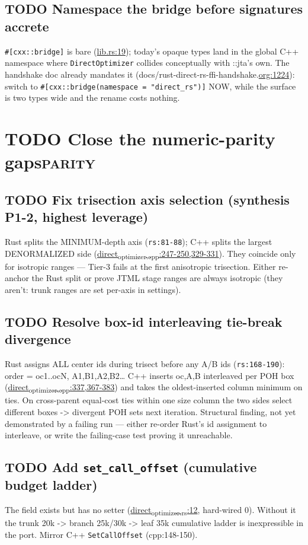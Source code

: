 \documentclass[11pt]{article}
\begin{document}
\subsection{{\bfseries\sffamily TODO} Namespace the bridge before signatures accrete}
\label{sec:org42a9213}
\texttt{\#[cxx::bridge]} is bare (\href{rust/direct-rs/src/lib.rs}{lib.rs:19}); today's opaque types land in the
global C++ namespace where \texttt{DirectOptimizer} collides conceptually with
::jta's own. The handshake doc already mandates it
(docs/rust-direct-rs-ffi-handshake.\url{org:1224}): switch to
\texttt{\#[cxx::bridge(namespace = "direct\_rs")]} NOW, while the surface is two
types wide and the rename costs nothing.
\section{{\bfseries\sffamily TODO} Close the numeric-parity gaps\hfill{}\textsc{parity}}
\label{sec:org01a4bc2}

\subsection{{\bfseries\sffamily TODO} Fix trisection axis selection (synthesis P1-2, highest leverage)}
\label{sec:orgb12c191}
Rust splits the MINIMUM-depth axis (\texttt{rs:81-88}); C++ splits the largest
DENORMALIZED side (\href{src/domain/direct\_optimizer.cpp}{direct\textsubscript{optimizer.cpp}:247-250,329-331}). They coincide
only for isotropic ranges — Tier-3 fails at the first anisotropic
trisection. Either re-anchor the Rust split or prove JTML stage ranges
are always isotropic (they aren't: trunk ranges are set per-axis in
settings).
\subsection{{\bfseries\sffamily TODO} Resolve box-id interleaving tie-break divergence}
\label{sec:org752a104}
Rust assigns ALL center ids during trisect before any A/B ids
(\texttt{rs:168-190}): order = oc1..ocN, A1,B1,A2,B2\ldots{} C++ inserts oc,A,B
interleaved per POH box (\href{src/domain/direct\_optimizer.cpp}{direct\textsubscript{optimizer.cpp}:337,367-383}) and takes the
oldest-inserted column minimum on ties. On cross-parent equal-cost ties
within one size column the two sides select different boxes -> divergent
POH sets next iteration. Structural finding, not yet demonstrated by a
failing run — either re-order Rust's id assignment to interleave, or
write the failing-case test proving it unreachable.
\subsection{{\bfseries\sffamily TODO} Add \texttt{set\_call\_offset} (cumulative budget ladder)}
\label{sec:org5dfa717}
The field exists but has no setter (\href{rust/direct-rs/src/direct\_optimizer.rs}{direct\textsubscript{optimizer.rs}:12}, hard-wired
0). Without it the trunk 20k -> branch 25k/30k -> leaf 35k cumulative
ladder is inexpressible in the port. Mirror C++
\texttt{SetCallOffset} (cpp:148-150).
\end{document}
